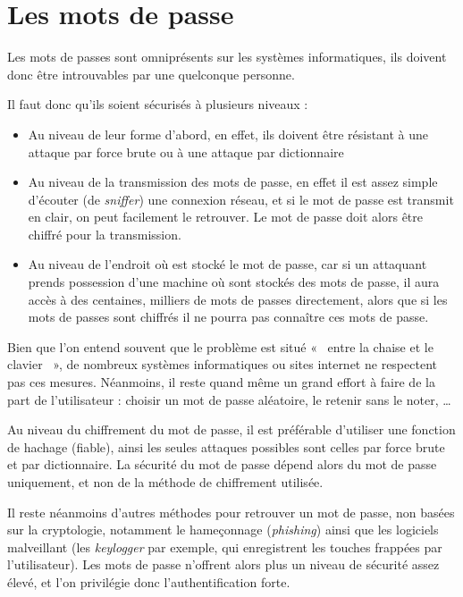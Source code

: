 \section{Les mots de passe}
Les mots de passes sont omniprésents sur les systèmes
informatiques, ils doivent donc être introuvables par une
quelconque personne.

Il faut donc qu'ils soient sécurisés à plusieurs niveaux : 
\begin{itemize}
  \item Au niveau de leur forme d'abord, en effet, ils doivent
être résistant à une attaque par force brute ou à une attaque 
par dictionnaire
  \item Au niveau de la transmission des mots de passe, en effet
il est assez simple d'écouter (de \emph{sniffer}) une connexion
réseau, et si le mot de passe est transmit en clair, on peut
facilement le retrouver. Le mot de passe doit alors être chiffré
pour la transmission.
  \item Au niveau de l'endroit où est stocké le mot de passe, car
si un attaquant prends possession d'une machine où sont stockés
des mots de passe, il aura accès à des centaines, milliers de mots
de passes directement, alors que si les mots de passes sont
chiffrés il ne pourra pas connaître ces mots de passe.
\end{itemize}

Bien que l'on entend souvent que le problème est situé «~ entre la
chaise et le clavier ~», de nombreux systèmes informatiques ou
sites internet ne respectent pas ces mesures. Néanmoins, il reste
quand même un grand effort à faire de la part de l'utilisateur :
choisir un mot de passe aléatoire, le retenir sans le noter, …

Au niveau du chiffrement du mot de passe, il est préférable
d'utiliser une fonction de hachage (fiable), ainsi les seules
attaques possibles sont celles par force brute et par
dictionnaire. La sécurité du mot de passe dépend alors du mot de
passe uniquement, et non de la méthode de chiffrement utilisée.

Il reste néanmoins d'autres méthodes pour retrouver un mot de
passe, non basées sur la cryptologie, notamment le hameçonnage
(\emph{phishing}) ainsi que les logiciels malveillant (les
\emph{keylogger} par exemple, qui enregistrent les touches
frappées par l'utilisateur).
Les mots de passe n'offrent alors plus un niveau de sécurité assez
élevé, et l'on privilégie donc l'authentification forte.

